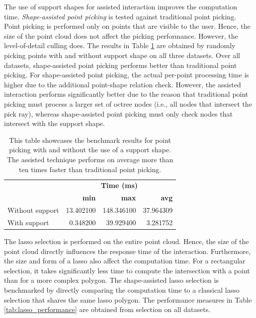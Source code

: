 The use of support shapes for assisted interaction improves the computation time. \textit{Shape-assisted point picking} is tested against traditional point picking. Point picking is performed only on points that are visible to the user. Hence, the size of the point cloud does not affect the picking performance. However, the level-of-detail culling does. The results in Table \ref{tab:picking_performance} are obtained by randomly picking points with and without support shape on all three datasets. Over all datasets, shape-assisted point picking performs better than traditional point picking. For shape-assisted point picking, the actual per-point processing time is higher due to the additional point-shape relation check. However, the assisted interaction performs significantly better due to the reason that traditional point picking must process a larger set of octree nodes (i.e., all nodes that intersect the pick ray), whereas shape-assisted point picking must only check nodes that intersect with the support shape. 

\begin{table}
\centering
\begin{tabular}{ l|r| r | r }
                       &\multicolumn{3}{c}{\textbf{Time (ms)}}\\
                       & \textbf{min}    & \textbf{max}    & \textbf{avg} \\
        \hline
        Without support& 13.402100  & 148.346100 & 37.964309 \\
        With support   &  0.348200  &  39.929400 &  3.281752 \\

\end{tabular}
\caption{This table showcases the benchmark results for point picking with and without the use of a support shape. The assisted technique performs on average more than ten times faster than traditional point picking. }
\label{tab:picking_performance}
\end{table}

The lasso selection is performed on the entire point cloud. Hence, the size of the point cloud directly influences the response time of the interaction. Furthermore, the size and form of a lasso also affect the computation time. For a rectangular selection, it takes significantly less time to compute the intersection with a point than for a more complex polygon. The shape-assisted lasso selection is benchmarked by directly comparing the computation time to a classical lasso selection that shares the same lasso polygon. The performance measures in Table \ref{tab:lasso_performance} are obtained from selection on all datasets.

